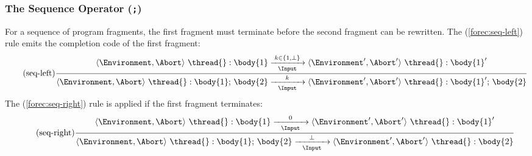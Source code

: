\subsubsection{The Sequence Operator (\texttt{;})}
For a sequence of program fragments, the first fragment 
must terminate before the second fragment  can be rewritten. 
The (\ref{forec:seq-left}) rule emits the completion code of 
the first fragment:
\begin{equation*}
	\tag{seq-left}
	\label{forec:seq-left}
	\frac{
			\langle \Environment, \Abort \rangle ~ \thread{}:\body{1}
				\xrightarrow[~~\Input~~]{k \in \lbrace 1, \bot \rbrace}
			\langle \Environment', \Abort' \rangle ~ \thread{}:\body{1}'
		}{
			\langle \Environment, \Abort \rangle ~ \thread{}:\body{1}\mathtt{;}~\body{2}
				\xrightarrow[~~\Input~~]{k} 
			\langle \Environment', \Abort' \rangle ~ \thread{}:\body{1}'\mathtt{;}~\body{2}
		}
\end{equation*}
The (\ref{forec:seq-right}) rule is applied if the 
first fragment terminates:
\begin{equation*}
	\tag{seq-right}
	\label{forec:seq-right}
	\frac{
			\langle \Environment, \Abort \rangle ~ \thread{}:\body{1}
				\xrightarrow[~~\Input~~]{0}
			\langle \Environment', \Abort' \rangle ~ \thread{}:\body{1}'
		}{
			\langle \Environment, \Abort \rangle ~ \thread{}:\body{1}\mathtt{;}~\body{2}
				\xrightarrow[~~\Input~~]{\bot}
			\langle \Environment', \Abort' \rangle ~ \thread{}:\body{2}
		}
\end{equation*}

